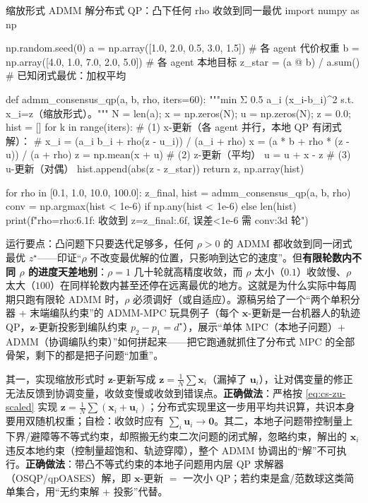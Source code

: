 \begin{codebox}[Python]{缩放形式 ADMM 解分布式 QP：凸下任何 rho 收敛到同一最优}
import numpy as np

np.random.seed(0)
a = np.array([1.0, 2.0, 0.5, 3.0, 1.5])   # 各 agent 代价权重
b = np.array([4.0, 1.0, 7.0, 2.0, 5.0])   # 各 agent 本地目标
z_star = (a @ b) / a.sum()                 # 已知闭式最优：加权平均

def admm_consensus_qp(a, b, rho, iters=60):
    """min Σ 0.5 a_i (x_i-b_i)^2 s.t. x_i=z（缩放形式）。"""
    N = len(a); x = np.zeros(N); u = np.zeros(N); z = 0.0; hist = []
    for k in range(iters):
        # (1) x-更新（各 agent 并行，本地 QP 有闭式解）：
        #    x_i = (a_i b_i + rho(z - u_i)) / (a_i + rho)
        x = (a * b + rho * (z - u)) / (a + rho)
        z = np.mean(x + u)                  # (2) z-更新（平均）
        u = u + x - z                       # (3) u-更新（对偶）
        hist.append(abs(z - z_star))
    return z, np.array(hist)

for rho in [0.1, 1.0, 10.0, 100.0]:
    z_final, hist = admm_consensus_qp(a, b, rho)
    conv = np.argmax(hist < 1e-6) if np.any(hist < 1e-6) else len(hist)
    print(f"rho={rho:6.1f}: 收敛到 z={z_final:.6f}, 误差<1e-6 需 {conv:3d} 轮")
\end{codebox}

\noindent 运行要点：凸问题下只要迭代足够多，任何 $\rho>0$ 的 ADMM 都收敛到同一闭式最优 $z^\star$——印证“$\rho$ 不改变最优解的位置，只影响到达它的速度”。但\textbf{有限轮数内不同 $\rho$ 的进度天差地别}：$\rho=1$ 几十轮就高精度收敛，而 $\rho$ 太小（$0.1$）收敛慢、$\rho$ 太大（$100$）在同样轮数内甚至还停在远离最优的地方。这就是为什么实际中每周期只跑有限轮 ADMM 时，$\rho$ 必须调好（或自适应）。源稿另给了一个“两个单积分器 + 末端编队约束”的 ADMM-MPC 玩具例子（每个 $\mathbf{x}$-更新是一台机器人的轨迹 QP，$\mathbf{z}$-更新投影到编队约束 $p_2-p_1=d^\star$），展示“单体 MPC（本地子问题）+ ADMM（协调编队约束）”如何拼起来——把它跑通就抓住了分布式 MPC 的全部骨架，剩下的都是把子问题“加重”。

\begin{pitfall}
其一，实现缩放形式时 $\mathbf{z}$-更新写成 $\mathbf{z}=\tfrac1N\sum\mathbf{x}_i$（漏掉了 $\mathbf{u}_i$），让对偶变量的修正无法反馈到协调变量，收敛变慢或收敛到错误点。\textbf{正确做法}：严格按 \cref{eq:cs-zu-scaled} 实现 $\mathbf{z}=\tfrac1N\sum(\mathbf{x}_i+\mathbf{u}_i)$；分布式实现里这一步用平均共识算，共识本身要用双随机权重；自检：收敛时应有 $\sum_i\mathbf{u}_i\to\mathbf{0}$。其二，本地子问题带控制量上下界/避障等不等式约束，却照搬无约束二次问题的闭式解，忽略约束，解出的 $\mathbf{x}_i$ 违反本地约束（控制量超饱和、轨迹穿障），整个 ADMM 协调出的“解”不可执行。\textbf{正确做法}：带凸不等式约束的本地子问题用内层 QP 求解器（OSQP/qpOASES）解，即 $\mathbf{x}$-更新 $=$ 一次小 QP；若约束是盒/范数球这类简单集合，用“无约束解 + 投影”代替。
\end{pitfall}

